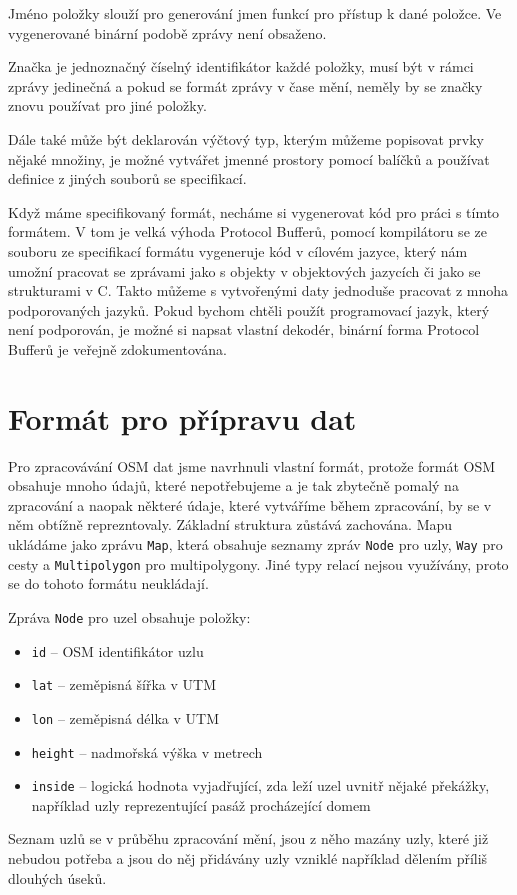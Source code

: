 {\tuc Jméno} položky slouží pro generování jmen funkcí pro přístup k dané
položce. Ve vygenerované binární podobě zprávy není obsaženo. 

{\tuc Značka} je jednoznačný číselný identifikátor každé položky, musí být v rámci
zprávy jedinečná a pokud se formát zprávy v čase mění, neměly by se značky znovu
používat pro jiné položky.

Dále také může být deklarován výčtový typ, kterým můžeme popisovat prvky
nějaké množiny, je možné vytvářet jmenné prostory pomocí balíčků a používat
definice z jiných souborů se specifikací.

Když máme specifikovaný formát, necháme si vygenerovat kód pro práci s tímto
formátem. V tom je velká výhoda Protocol Bufferů, pomocí kompilátoru se ze
souboru ze specifikací formátu vygeneruje kód v cílovém jazyce, který nám umožní
pracovat se zprávami jako s objekty v objektových jazycích či jako se
strukturami v C. Takto můžeme s vytvořenými daty jednoduše pracovat z mnoha
podporovaných jazyků. Pokud bychom chtěli použít programovací jazyk, který není
podporován, je možné si napsat vlastní dekodér, binární forma Protocol Bufferů
je veřejně zdokumentována.\cite{pbfenc}



\section{Formát pro přípravu dat}
Pro zpracovávání OSM dat jsme navrhnuli vlastní formát, protože formát OSM
obsahuje mnoho údajů, které nepotřebujeme a je tak zbytečně pomalý na zpracování
a naopak některé údaje, které vytváříme během zpracování, by se v něm obtížně
reprezntovaly. Základní struktura zůstává zachována. Mapu ukládáme jako zprávu
\verb|Map|, která obsahuje seznamy zpráv \verb|Node| pro uzly, \verb|Way| pro
cesty a \verb|Multipolygon| pro multipolygony. Jiné typy relací nejsou
využívány, proto se do tohoto formátu neukládají.

Zpráva \verb|Node| pro uzel obsahuje položky:
\begin{itemize}
	\item \verb|id| -- OSM identifikátor uzlu
	\item \verb|lat| -- zeměpisná šířka v UTM
	\item \verb|lon| -- zeměpisná délka v UTM
	\item \verb|height| -- nadmořská výška v metrech
	\item \verb|inside| -- logická hodnota vyjadřující, zda leží uzel uvnitř
	nějaké překážky, například uzly reprezentující pasáž procházející domem
\end{itemize}
Seznam uzlů se v průběhu zpracování mění, jsou z něho mazány uzly, které již
nebudou potřeba a jsou do něj přidávány uzly vzniklé například dělením příliš
dlouhých úseků.

